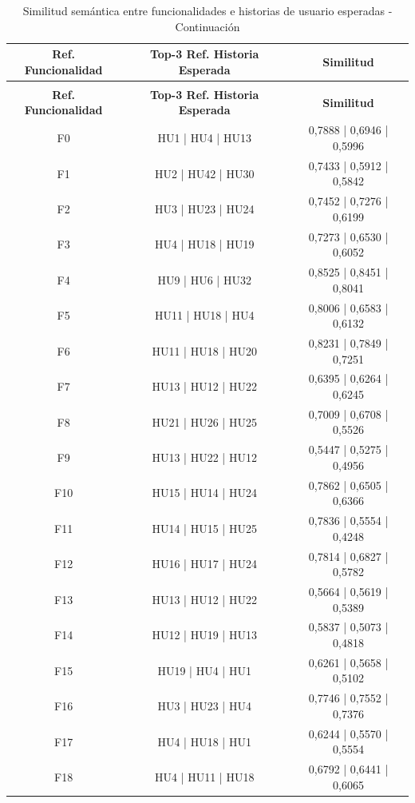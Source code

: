 \documentclass{prgrado}
\begin{document}
\begin{longtable}{|c|c|c|}
\caption{Similitud semántica entre funcionalidades e historias de usuario esperadas}
\label{tab:fun_historias_esperadas}\\
\hline
\textbf{Ref. Funcionalidad} & \textbf{Top-3 Ref. Historia Esperada} & \textbf{Similitud} \\
\hline
\endfirsthead

\caption{Similitud semántica entre funcionalidades e historias de usuario esperadas - Continuación} \\
\hline
\textbf{Ref. Funcionalidad} & \textbf{Top-3 Ref. Historia Esperada} & \textbf{Similitud} \\
\hline
\endhead

F0 & HU1 | HU4 | HU13 & 0,7888 | 0,6946 | 0,5996 \\ \hline
F1 & HU2 | HU42 | HU30 & 0,7433 | 0,5912 | 0,5842 \\ \hline
F2 & HU3 | HU23 | HU24 & 0,7452 | 0,7276 | 0,6199 \\ \hline
F3 & HU4 | HU18 | HU19 & 0,7273 | 0,6530 | 0,6052 \\ \hline
F4 & HU9 | HU6 | HU32 & 0,8525 | 0,8451 | 0,8041 \\ \hline
F5 & HU11 | HU18 | HU4 & 0,8006 | 0,6583 | 0,6132 \\ \hline
F6 & HU11 | HU18 | HU20 & 0,8231 | 0,7849 | 0,7251 \\ \hline
F7 & HU13 | HU12 | HU22 & 0,6395 | 0,6264 | 0,6245 \\ \hline
F8 & HU21 | HU26 | HU25 & 0,7009 | 0,6708 | 0,5526 \\ \hline
F9 & HU13 | HU22 | HU12 & 0,5447 | 0,5275 | 0,4956 \\ \hline
F10 & HU15 | HU14 | HU24 & 0,7862 | 0,6505 | 0,6366 \\ \hline
F11 & HU14 | HU15 | HU25 & 0,7836 | 0,5554 | 0,4248 \\ \hline
F12 & HU16 | HU17 | HU24 & 0,7814 | 0,6827 | 0,5782 \\ \hline
F13 & HU13 | HU12 | HU22 & 0,5664 | 0,5619 | 0,5389 \\ \hline
F14 & HU12 | HU19 | HU13 & 0,5837 | 0,5073 | 0,4818 \\ \hline
F15 & HU19 | HU4 | HU1 & 0,6261 | 0,5658 | 0,5102 \\ \hline
F16 & HU3 | HU23 | HU4 & 0,7746 | 0,7552 | 0,7376 \\ \hline
F17 & HU4 | HU18 | HU1 & 0,6244 | 0,5570 | 0,5554 \\ \hline
F18 & HU4 | HU11 | HU18 & 0,6792 | 0,6441 | 0,6065 \\ \hline

\end{longtable}
\end{document}
